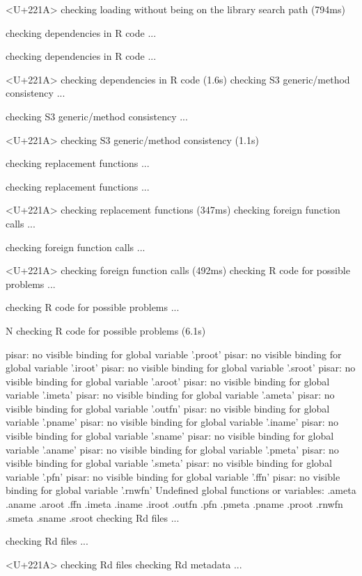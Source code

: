 \documentclass[a4paper,12pt]{article}\usepackage[]{graphicx}\usepackage[]{color}
\begin{document}
\begin{Schunk}
\begin{Soutput}
<U+221A>  checking loading without being on the library search path (794ms)

  
   checking dependencies in R code ...
  
   checking dependencies in R code ... 
  
<U+221A>  checking dependencies in R code (1.6s)
   checking S3 generic/method consistency ...
  
   checking S3 generic/method consistency ... 
  
<U+221A>  checking S3 generic/method consistency (1.1s)

  
   checking replacement functions ...
  
   checking replacement functions ... 
  
<U+221A>  checking replacement functions (347ms)
   checking foreign function calls ...
  
   checking foreign function calls ... 
  
<U+221A>  checking foreign function calls (492ms)
   checking R code for possible problems ...
  
   checking R code for possible problems ... 
  
N  checking R code for possible problems (6.1s)

  
   pisar: no visible binding for global variable '.proot'
   pisar: no visible binding for global variable '.iroot'
   pisar: no visible binding for global variable '.sroot'
   pisar: no visible binding for global variable '.aroot'
   pisar: no visible binding for global variable '.imeta'
   pisar: no visible binding for global variable '.ameta'
   pisar: no visible binding for global variable '.outfn'
   pisar: no visible binding for global variable '.pname'
   pisar: no visible binding for global variable '.iname'
   pisar: no visible binding for global variable '.sname'
   pisar: no visible binding for global variable '.aname'
   pisar: no visible binding for global variable '.pmeta'
   pisar: no visible binding for global variable '.smeta'
   pisar: no visible binding for global variable '.pfn'
   pisar: no visible binding for global variable '.ffn'
   pisar: no visible binding for global variable '.rnwfn'
   Undefined global functions or variables:
     .ameta .aname .aroot .ffn .imeta .iname .iroot .outfn .pfn .pmeta
     .pname .proot .rnwfn .smeta .sname .sroot
   checking Rd files ...
  
   checking Rd files ... 
  
<U+221A>  checking Rd files
   checking Rd metadata ...
  

\end{Soutput}
\end{Schunk}
\end{document}

